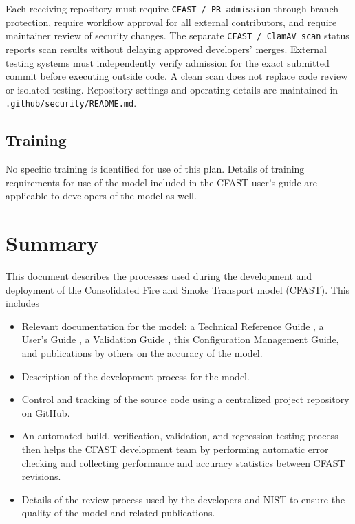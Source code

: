 \documentclass[12pt]{book}
\begin{document}
Each receiving repository must require \texttt{CFAST / PR admission} through branch protection, require workflow approval for all external contributors, and require maintainer review of security changes. The separate \texttt{CFAST / ClamAV scan} status reports scan results without delaying approved developers' merges. External testing systems must independently verify admission for the exact submitted commit before executing outside code. A clean scan does not replace code review or isolated testing. Repository settings and operating details are maintained in \texttt{.github/security/README.md}.

\section{Training}

No specific training is identified for use of this plan.  Details of training requirements for use of the model included in the CFAST user's guide are applicable to developers of the model as well.

\chapter{Summary}

This document describes the processes used during the development and deployment of the Consolidated Fire and Smoke Transport model (CFAST). This includes

\begin{itemize}
    \item Relevant documentation for the model: a Technical Reference Guide \cite{CFAST_Tech_Guide_8}, a User's Guide \cite{CFAST_Users_Guide_8}, a Validation Guide \cite{CFAST_Valid_Guide_8}, this Configuration Management Guide, and publications by others on the accuracy of the model.
    
    \item Description of the development process for the model.
    
    \item Control and tracking of the source code using a centralized project repository on GitHub.
    
    \item An automated build, verification, validation, and regression testing process then helps the CFAST development team by performing automatic error checking and collecting performance and accuracy statistics between CFAST revisions.
    
    \item Details of the review process used by the developers and NIST to ensure the quality of the model and related publications.
    
\end{itemize}
\end{document}
